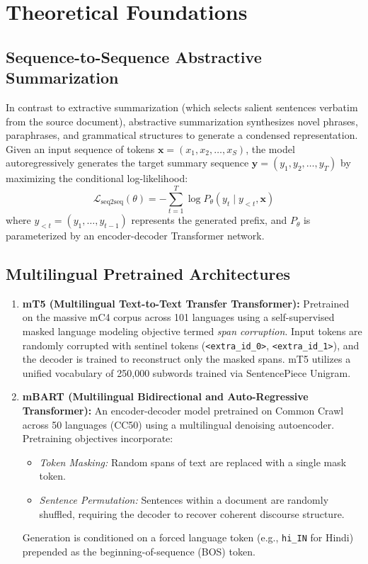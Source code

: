 \documentclass[12pt,a4paper]{report}
\begin{document}
\section{Theoretical Foundations}
\subsection{Sequence-to-Sequence Abstractive Summarization}
In contrast to extractive summarization (which selects salient sentences verbatim from the source document), abstractive summarization synthesizes novel phrases, paraphrases, and grammatical structures to generate a condensed representation. Given an input sequence of tokens $\mathbf{x} = (x_1, x_2, \dots, x_S)$, the model autoregressively generates the target summary sequence $\mathbf{y} = (y_1, y_2, \dots, y_T)$ by maximizing the conditional log-likelihood:
\begin{equation}
    \mathcal{L}_{\text{seq2seq}}(\theta) = -\sum_{t=1}^{T} \log P_\theta(y_t \mid y_{<t}, \mathbf{x})
\end{equation}
where $y_{<t} = (y_1, \dots, y_{t-1})$ represents the generated prefix, and $P_\theta$ is parameterized by an encoder-decoder Transformer network.

\subsection{Multilingual Pretrained Architectures}
\begin{enumerate}
    \item \textbf{mT5 (Multilingual Text-to-Text Transfer Transformer):} Pretrained on the massive mC4 corpus across 101 languages using a self-supervised masked language modeling objective termed \textit{span corruption}. Input tokens are randomly corrupted with sentinel tokens (\lstinline|<extra_id_0>|, \lstinline|<extra_id_1>|), and the decoder is trained to reconstruct only the masked spans. mT5 utilizes a unified vocabulary of 250,000 subwords trained via SentencePiece Unigram.
    \item \textbf{mBART (Multilingual Bidirectional and Auto-Regressive Transformer):} An encoder-decoder model pretrained on Common Crawl across 50 languages (CC50) using a multilingual denoising autoencoder. Pretraining objectives incorporate:
    \begin{itemize}
        \item \textit{Token Masking:} Random spans of text are replaced with a single mask token.
        \item \textit{Sentence Permutation:} Sentences within a document are randomly shuffled, requiring the decoder to recover coherent discourse structure.
    \end{itemize}
    Generation is conditioned on a forced language token (e.g., \texttt{hi\_IN} for Hindi) prepended as the beginning-of-sequence (BOS) token.
\end{enumerate}
\end{document}
